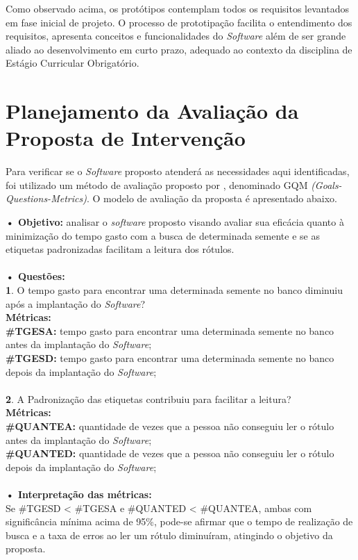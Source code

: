 \documentclass[12pt,a4paper]{article}
\begin{document}
Como observado acima, os protótipos contemplam todos os requisitos levantados em fase inicial de projeto. O processo de prototipação facilita o entendimento dos requisitos, apresenta conceitos e funcionalidades do {\it Software} além de ser grande aliado ao desenvolvimento em curto prazo, adequado ao contexto da disciplina de Estágio Curricular Obrigatório.


\section{Planejamento da Avaliação da Proposta de Intervenção}

Para verificar se o {\it Software} proposto atenderá as necessidades aqui identificadas, foi utilizado um método de avaliação proposto por \cite{caldiera1994goal}, denominado GQM {\it (Goals-Questions-Metrics)}. O modelo de avaliação da proposta é apresentado abaixo.

{\bf• Objetivo:} analisar o {\it software} proposto visando avaliar sua eficácia quanto à minimização do tempo gasto com a busca de determinada semente e se as etiquetas padronizadas facilitam a leitura dos rótulos.\\\\
{\bf• Questões:}\\
{\bf  1}. O tempo gasto para encontrar uma determinada semente no banco diminuiu após a implantação do {\it Software}?\\
{\bf Métricas:} \\
{\bf  \#TGESA: } tempo gasto para encontrar uma determinada semente no banco antes da implantação do {\it Software};\\
{\bf  \#TGESD: } tempo gasto para encontrar uma determinada semente no banco depois da implantação do {\it Software};
\\
\\
{\bf   2}. A Padronização das etiquetas contribuiu para facilitar a leitura?\\
{\bf Métricas:} \\
{\bf  \#QUANTEA: } quantidade de vezes que a pessoa não conseguiu ler o rótulo antes da implantação do {\it Software};\\
{\bf  \#QUANTED: } quantidade de vezes que a pessoa não conseguiu ler o rótulo depois da implantação do {\it Software};\\
\\
{\bf• Interpretação das métricas:}\\
Se  \#TGESD < \#TGESA e \#QUANTED < \#QUANTEA, ambas com significância mínima acima de 95\%, pode-se afirmar que
o tempo de realização de busca e a taxa de erros ao ler um rótulo diminuíram, atingindo o objetivo da proposta.
\end{document}
